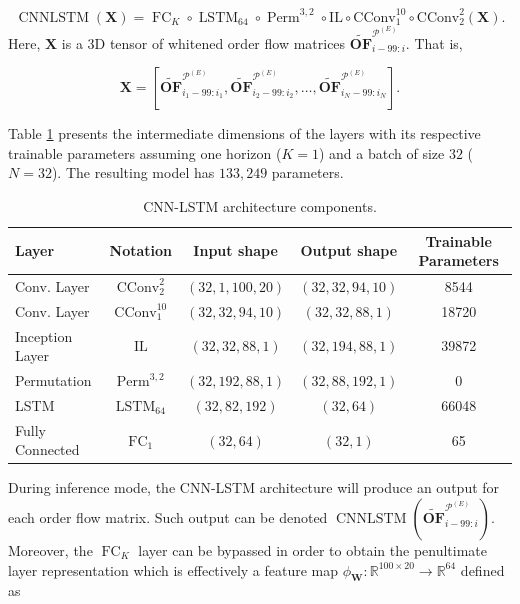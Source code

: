 \documentclass[10pt,a4paper,oneside]{article}
\newcommand{\R}{\mathbb{R}}
\DeclareMathOperator{\perm}{Perm}
\DeclareMathOperator{\fullyconnected}{FC}
\DeclareMathOperator{\lstm}{LSTM}
\DeclareMathOperator{\cnnlstm}{CNNLSTM}
\begin{document}
$$
\cnnlstm(\mathbf{X}) = \fullyconnected_K \circ \lstm_{64} \circ \perm^{3, 2} \circ \mathrm{IL} \circ \mathrm{CConv}^{10}_1 \circ \mathrm{CConv}^{2}_2 \left(\mathbf{X}\right).
$$
Here, $\mathbf{X}$ is a 3D tensor of whitened order flow matrices $\widetilde{\mathbf{OF}}^{\mathcal{P}^{(E)}}_{i - 99:i}$. That is,

$$
\mathbf{X} = \left[ \widetilde{\mathbf{OF}}^{\mathcal{P}^{(E)}}_{i_1 - 99:i_1}, \widetilde{\mathbf{OF}}^{\mathcal{P}^{(E)}}_{i_2 - 99:i_2}, \dots, \widetilde{\mathbf{OF}}^{\mathcal{P}^{(E)}}_{i_N - 99:i_N}\right].
$$

Table \ref{tab:cnnlstm} presents the intermediate dimensions of the layers with its respective trainable parameters assuming one horizon ($K = 1$) and a batch of size $32$ ($N = 32$). The resulting model has $133,249$ parameters.


\begin{table}[htb]
\centering
\begin{tabular}{@{}lcccc@{}}
\toprule
Layer           & Notation           & Input shape        & Output shape          & Trainable Parameters  \\ \midrule
Conv. Layer     & $\mathrm{CConv}^{2}_2$   & $(32, 1, 100, 20)$ & $(32,  32,  94, 10)$ & 8544           \\
Conv. Layer     & $\mathrm{CConv}^{10}_1$  & $(32, 32, 94, 10)$ & $(32, 32, 88, 1)$    & 18720           \\
Inception Layer & $\mathrm{IL}$            & $(32,  32, 88, 1)$ & $(32, 194, 88, 1)$   & 39872           \\
Permutation     & $\perm^{3,2}$            & $(32, 192, 88, 1)$ & $(32, 88, 192, 1)$   & 0               \\
LSTM            & $\lstm_{64}$             & $(32, 82, 192)$    & $(32, 64)$           & 66048           \\ 
Fully Connected & $\fullyconnected_{1}$    & $(32, 64)$         & $(32, 1)$            & 65   \\\bottomrule
\end{tabular}
\caption{CNN-LSTM architecture components.}
\label{tab:cnnlstm}
\end{table}

During inference mode, the CNN-LSTM architecture will produce an output for each order flow matrix. Such output can be denoted $\cnnlstm \left(\widetilde{\mathbf{OF}}^{\mathcal{P}^{(E)}}_{i - 99:i} \right)$. Moreover, the $\fullyconnected_K$ layer can be bypassed in order to obtain the penultimate layer representation which is effectively a feature map $\phi_{\mathbf{W}} : \R^{100 \times 20} \rightarrow \R^{64}$ defined as
\end{document}
